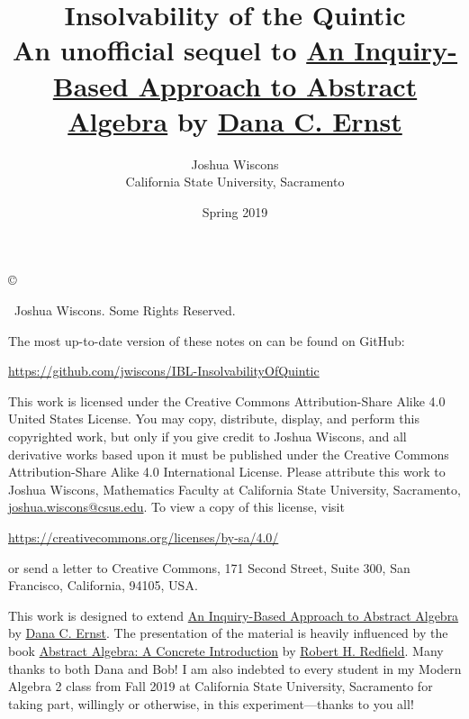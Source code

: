 \documentclass[12pt,oneside]{book}
\theoremstyle{definition}
\begin{document}
\title{Insolvability of the Quintic\\ {\small \normalfont An unofficial sequel to \href{https://github.com/dcernst/IBL-AbstractAlgebra}{An Inquiry-Based Approach to Abstract Algebra} by \href{http://danaernst.com}{Dana C. Ernst}}}
\author{Joshua Wiscons\\
California State University, Sacramento}
\date{Spring 2019}

\maketitle

\noindent\copyright{ \the\year\ Joshua Wiscons.  Some Rights Reserved.\\

\bigskip

\noindent The most up-to-date version of these notes on can be found on GitHub:
\begin{center}
\url{https://github.com/jwiscons/IBL-InsolvabilityOfQuintic}
\end{center}

\bigskip

\noindent This work is licensed under the Creative Commons Attribution-Share Alike 4.0 United States License.  You may copy, distribute, display, and perform this copyrighted work, but only if you give credit to Joshua Wiscons, and all derivative works based upon it must be published under the Creative Commons Attribution-Share Alike 4.0 International License. Please attribute this work to Joshua Wiscons, Mathematics Faculty at California State University, Sacramento, \url{joshua.wiscons@csus.edu}. To view a copy of this license, visit
\begin{center}
\url{https://creativecommons.org/licenses/by-sa/4.0/}
\end{center}
or send a letter to Creative Commons, 171 Second Street, Suite 300, San Francisco, California, 94105, USA.}

\medskip

\begin{center}
\ccbysa
\end{center}

\noindent This work is designed to extend \href{https://github.com/dcernst/IBL-AbstractAlgebra}{An Inquiry-Based Approach to Abstract Algebra} by \href{http://danaernst.com}{Dana C. Ernst}. The presentation of the material is heavily influenced by the book \href{https://www.amazon.com/Abstract-Algebra-Introduction-Robert-Redfield/dp/020143721X}{Abstract Algebra: A Concrete Introduction} by \href{https://www.hamilton.edu/academics/our-faculty/directory/faculty-detail/robert-redfield}{Robert H. Redfield}. Many thanks to both Dana and Bob! I am also indebted to every student in my Modern Algebra 2 class from Fall 2019 at California State University, Sacramento for taking part, willingly or otherwise, in this experiment---thanks to you all! 

\tableofcontents






\appendix

\end{document}
